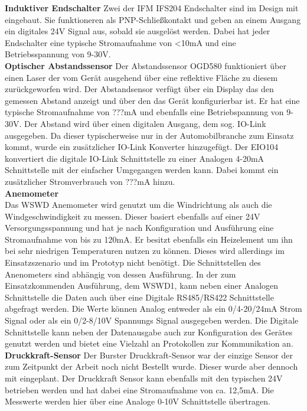 \noindent\textbf{Induktiver Endschalter}\newline
Zwei der IFM IFS204 Endschalter sind im Design mit eingebaut. Sie funktioneren als PNP-Schließkontakt und geben an einem Ausgang ein digitales 24V Signal aus, sobald sie ausgelöst werden. Dabei hat jeder Endschalter eine typische Stromaufnahme von <10mA und eine Betriebsspannung von 9-30V.\\

\noindent\textbf{Optischer Abstandssensor}\newline
Der Abstandssensor OGD580 funktioniert über einen Laser der vom Gerät ausgehend über eine reflektive Fläche zu diesem zurückgeworfen wird. Der Abstandsensor verfügt über ein Display das den gemessen Abstand anzeigt und über den das Gerät konfigurierbar ist. Er hat eine typische Stromaufnahme von ???mA und ebenfalls eine Betriebspannung von 9-30V. Der Abstand wird über einen digitalen Ausgang, dem sog. IO-Link ausgegeben. Da dieser typischerweise nur in der Automobilbranche zum Einsatz kommt, wurde ein zusätzlicher IO-Link Konverter hinzugefügt. Der EIO104 konvertiert die digitale IO-Link Schnittstelle zu einer Analogen 4-20mA Schnittstelle mit der einfacher Umgegangen werden kann. Dabei kommt ein zusätzlicher Stromverbrauch von ???mA hinzu.\\

\noindent\textbf{Anemometer}\\
Das WSWD Anemometer wird genutzt um die Windrichtung als auch die Windgeschwindigkeit zu messen. Dieser basiert ebenfalls auf einer 24V Versorgungsspannung und hat je nach Konfiguration und Ausführung eine Stromaufnahme von bis zu 120mA. Er besitzt ebenfalls ein Heizelement um ihn bei sehr niedrigen Temperaturen nutzen zu können. Dieses wird allerdings im Einsatzszenario und im Prototyp nicht benötigt. Die Schnittstellen des Anenometers sind abhängig von dessen Ausführung. In der zum Einsatzkommenden Ausführung, dem WSWD1, kann neben einer Analogen Schnittstelle die Daten auch über eine Digitale RS485/RS422 Schnittstelle abgefragt werden. Die Werte können Analog entweder als ein 0/4-20/24mA Strom Signal oder als ein 0/2-8/10V Spannungs Signal ausgegeben werden. Die Digitale Schnittstelle kann neben der Datenausgabe auch zur Konfiguration des Gerätes genutzt werden und bietet eine Vielzahl an Protokollen zur Kommunikation an.\\

\noindent\textbf{Druckkraft-Sensor}\newline
Der Burster Druckkraft-Sensor war der einzige Sensor der zum Zeitpunkt der Arbeit noch nicht Bestellt wurde. Dieser wurde aber dennoch mit eingeplant. Der Druckkraft Sensor kann ebenfalls mit den typischen 24V betrieben werden und hat dabei eine Stromaufnahme von ca. 12,5mA. Die Messwerte werden hier über eine Analoge 0-10V Schnittstelle übertragen.\\

